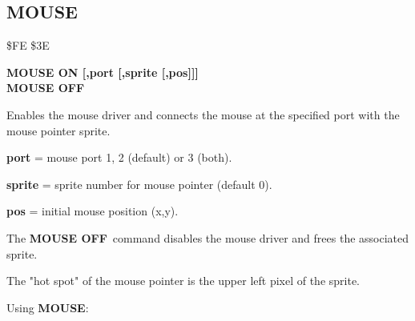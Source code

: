 
\newpage
\subsection{MOUSE}
\begin{description}[leftmargin=3cm,style=nextline]
\item [Token:] \$FE \$3E
\item [Format:] {\bf MOUSE ON [,port [,sprite [,pos]]]} \\
                {\bf MOUSE OFF}
\item [Usage:]  Enables the mouse driver
                and connects the mouse at the specified port
                with the mouse pointer sprite.

                {\bf port} = mouse port 1, 2 (default) or 3 (both).

                {\bf sprite} = sprite number for mouse pointer (default 0).

                {\bf pos} = initial mouse position (x,y).

                The {\bf MOUSE OFF} command disables the mouse
                driver and frees the associated sprite.

\item [Remarks:] The "hot spot" of the mouse pointer is the upper left
                pixel of the sprite.

\item [Example:] Using {\bf MOUSE}:
\end{description}


\newpage
